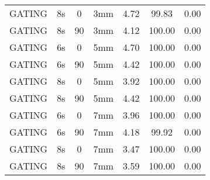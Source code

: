 \begin{table}[H]
\begin{tabular}{|c||c|c|c||c|c|c|}
GATING & 8s & 0 & 3mm & 4.72 & 99.83 & 0.00 \\
GATING & 8s & 90 & 3mm & 4.12 & 100.00 & 0.00 \\
GATING & 6s & 0 & 5mm & 4.70 & 100.00 & 0.00 \\
GATING & 6s & 90 & 5mm & 4.42 & 100.00 & 0.00 \\
GATING & 8s & 0 & 5mm & 3.92 & 100.00 & 0.00 \\
GATING & 8s & 90 & 5mm & 4.42 & 100.00 & 0.00 \\
GATING & 6s & 0 & 7mm & 3.96 & 100.00 & 0.00 \\
GATING & 6s & 90 & 7mm & 4.18 & 99.92 & 0.00 \\
GATING & 8s & 0 & 7mm & 3.47 & 100.00 & 0.00 \\
GATING & 8s & 90 & 7mm & 3.59 & 100.00 & 0.00 \\
    \hline\hline 
  \end{tabular}
\end{table}

\newpage

